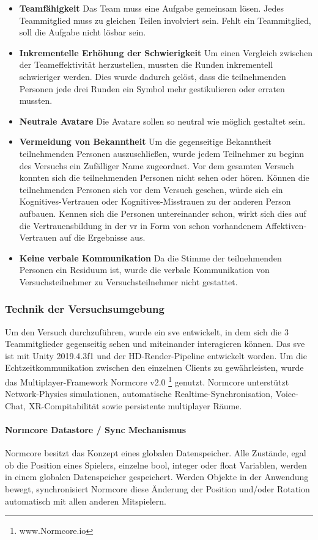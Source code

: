 \documentclass[a4paper,11pt]{article}%
\renewcommand{\\}{\vspace*{0.5\baselineskip} \newline}
\begin{document}
\begin{itemize}
\item \textbf{Teamfähigkeit} Das Team muss eine Aufgabe gemeinsam lösen. Jedes Teammitglied muss zu gleichen Teilen involviert sein. Fehlt ein Teammitglied, soll die Aufgabe nicht lösbar sein.
\item \textbf{Inkrementelle Erhöhung der Schwierigkeit} Um einen Vergleich zwischen der Teameffektivität herzustellen, mussten die Runden inkrementell schwieriger werden. Dies wurde dadurch gelöst, dass die teilnehmenden Personen jede drei Runden ein Symbol mehr gestikulieren  oder erraten mussten.
\item \textbf{Neutrale Avatare} Die Avatare sollen so neutral wie möglich gestaltet sein. 
\item \textbf{Vermeidung von Bekanntheit} Um die gegenseitige Bekanntheit  teilnehmenden Personen auszuschließen, wurde jedem Teilnehmer zu beginn des Versuchs ein Zufälliger Name zugeordnet. Vor dem gesamten Versuch konnten sich die teilnehmenden Personen nicht sehen oder hören.
Können die teilnehmenden Personen sich vor dem Versuch gesehen, würde sich ein Kognitives-Vertrauen oder Kognitives-Misstrauen zu der anderen Person aufbauen. 
Kennen sich die Personen untereinander schon, wirkt sich dies auf die Vertrauensbildung in der \ac{vr} in Form von schon vorhandenem Affektiven-Vertrauen auf die Ergebnisse aus.
\item \textbf{Keine verbale Kommunikation} Da die Stimme der teilnehmenden Personen ein Residuum ist, wurde die verbale Kommunikation von Versuchsteilnehmer zu Versuchsteilnehmer nicht gestattet. 
\end{itemize}

\subsubsection{Technik der Versuchsumgebung}
Um den Versuch durchzuführen, wurde ein \ac{sve} entwickelt, in dem sich die 3 Teammitglieder gegenseitig sehen und miteinander interagieren können. 
Das \ac{sve} ist mit Unity 2019.4.3f1 und der HD-Render-Pipeline entwickelt worden. Um die Echtzeitkommunikation zwischen den einzelnen Clients zu gewährleisten, wurde das Multiplayer-Framework \dq{}Normcore v2.0\dq{} \footnote{www.Normcore.io} genutzt.
Normcore unterstützt Network-Physics simulationen, automatische Realtime-Synchronisation, Voice-Chat, XR-Compitabilität sowie persistente multiplayer Räume.	

\paragraph{Normcore Datastore / Sync Mechanismus}
Normcore besitzt das Konzept eines globalen Datenspeicher.  Alle Zustände, egal ob die Position eines Spielers, einzelne bool, integer oder float Variablen, werden in einem globalen Datenspeicher gespeichert. Werden Objekte in der Anwendung bewegt, synchronisiert Normcore diese Änderung der Position und/oder Rotation automatisch mit allen anderen Mitspielern.
\end{document}
